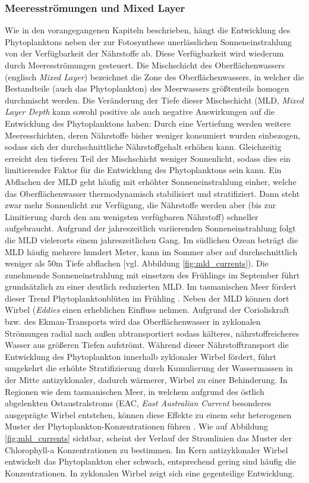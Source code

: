 \documentclass[12pt,a4paper,onecolumn]{scrartcl}
\begin{document}
\subsubsection{Meeresströmungen und Mixed Layer}
Wie in den vorangegangenen Kapiteln beschrieben, hängt die Entwicklung des Phytoplanktons neben der zur Fotosynthese unerlässlichen Sonneneinstrahlung von der Verfügbarkeit der Nährstoffe ab. Diese Verfügbarkeit wird wiederum durch Meeresströmungen gesteuert. Die Mischschicht des Oberflächenwassers (englisch \textit{Mixed Layer}) bezeichnet die Zone des Oberflächenwassers, in welcher die Bestandteile (auch das Phytoplankton) des Meerwassers größtenteils homogen durchmischt werden. Die Veränderung der Tiefe dieser Mischschicht (MLD, \textit{Mixed Layer Depth} kann sowohl positive als auch negative Auswirkungen auf die Entwicklung des Phytoplanktons haben: Durch eine Vertiefung werden weitere Meeresschichten, deren Nährstoffe bisher weniger konsumiert wurden einbezogen, sodass sich der durchschnittliche Nährstoffgehalt erhöhen kann. Gleichzeitig erreicht den tieferen Teil der Mischschicht weniger Sonnenlicht, sodass dies ein limitierender Faktor für die Entwicklung des Phytoplanktons sein kann. Ein Abflachen der MLD geht häufig mit erhöhter Sonneneinstrahlung einher, welche das Oberflächenwasser thermodynamisch stabilisiert und stratifiziert. Dann steht zwar mehr Sonnenlicht zur Verfügung, die Nährstoffe werden aber (bis zur Limitierung durch den am wenigsten verfügbaren Nährstoff) schneller aufgebraucht. Aufgrund der jahreszeitlich variierenden Sonneneinstrahlung folgt die MLD vielerorts einem jahreszeitlichen Gang. Im südlichen Ozean beträgt die MLD häufig mehrere hundert Meter, kann im Sommer aber auf durchschnittlich weniger als 50m Tiefe abflachen [vgl. Abbildung \ref{fig:mld_currents}). Die zunehmende Sonneneinstrahlung mit einsetzen des Frühlings im September führt grundsätzlich zu einer deutlich reduzierten MLD. Im tasmanischen Meer fördert dieser Trend Phytoplanktonblüten im Frühling \citep{Tilburg.2002}. Neben der MLD können dort Wirbel (\textit{Eddies} einen erheblichen Einfluss nehmen. Aufgrund der Corioliskraft bzw. des Ekman-Transports wird das Oberflächenwasser in zyklonalen Strömungen radial nach außen abtransportiert sodass kälteres, nährstoffreicheres Wasser aus größeren Tiefen aufströmt. Während dieser Nährstofftransport die Entwicklung des Phytoplankton innerhalb zyklonaler Wirbel fördert, führt umgekehrt die erhöhte Stratifizierung durch Kumulierung der Wassermassen in der Mitte antizyklonaler, dadurch wärmerer, Wirbel zu einer Behinderung. In Regionen wie dem tasmanischen Meer, in welchem aufgrund des östlich abgelenkten Ostaustralstroms (EAC, \textit{East Australian Current} besonderes ausgeprägte Wirbel entstehen, können diese Effekte zu einem sehr heterogenen Muster der Phytoplankton-Konzentrationen führen \citep{Tilburg.2002}. Wie auf Abbildung \ref{fig:mld_currents} sichtbar, scheint der Verlauf der Stromlinien das Muster der Chlorophyll-a Konzentrationen zu bestimmen. Im Kern antizyklonaler Wirbel entwickelt das Phytoplankton eher schwach, entsprechend gering sind häufig die Konzentrationen. In zyklonalen Wirbel zeigt sich eine gegenteilige Entwicklung.
\end{document}
